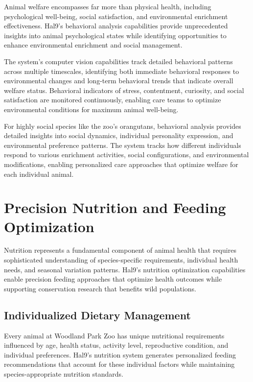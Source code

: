 \documentclass[
  Letterpaper,
]{scrbook}
\begin{document}
Animal welfare encompasses far more than physical health, including
psychological well-being, social satisfaction, and environmental
enrichment effectiveness. Hal9's behavioral analysis capabilities
provide unprecedented insights into animal psychological states while
identifying opportunities to enhance environmental enrichment and social
management.

The system's computer vision capabilities track detailed behavioral
patterns across multiple timescales, identifying both immediate
behavioral responses to environmental changes and long-term behavioral
trends that indicate overall welfare status. Behavioral indicators of
stress, contentment, curiosity, and social satisfaction are monitored
continuously, enabling care teams to optimize environmental conditions
for maximum animal well-being.

For highly social species like the zoo's orangutans, behavioral analysis
provides detailed insights into social dynamics, individual personality
expression, and environmental preference patterns. The system tracks how
different individuals respond to various enrichment activities, social
configurations, and environmental modifications, enabling personalized
care approaches that optimize welfare for each individual animal.

\section{Precision Nutrition and Feeding
Optimization}\label{precision-nutrition-and-feeding-optimization}

Nutrition represents a fundamental component of animal health that
requires sophisticated understanding of species-specific requirements,
individual health needs, and seasonal variation patterns. Hal9's
nutrition optimization capabilities enable precision feeding approaches
that optimize health outcomes while supporting conservation research
that benefits wild populations.

\subsection{Individualized Dietary
Management}\label{individualized-dietary-management}

Every animal at Woodland Park Zoo has unique nutritional requirements
influenced by age, health status, activity level, reproductive
condition, and individual preferences. Hal9's nutrition system generates
personalized feeding recommendations that account for these individual
factors while maintaining species-appropriate nutrition standards.
\end{document}
